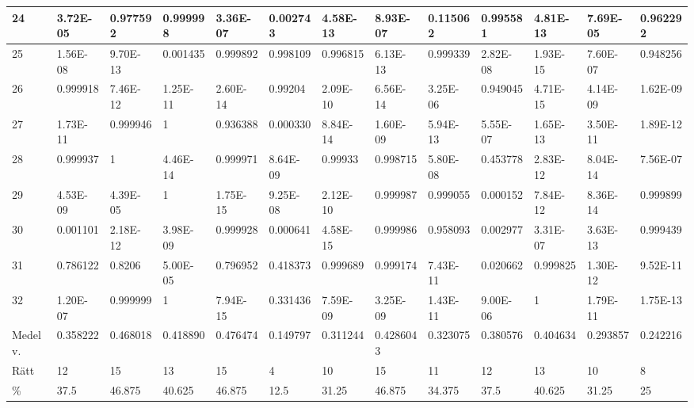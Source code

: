 \documentclass[a4paper,10pt]{article}
\begin{document}
\begin{centering}
{\begin{tabular}{ |l|l|l|l|l|l|l|l|l|l|l|l|l| }
24	       & 3.72E-05 & 0.977592 & 0.999998 & 3.36E-07 & 0.002743 & 4.58E-13 &  8.93E-07 & 0.115062  & 0.995581 &  4.81E-13 & 7.69E-05 & 0.962292 \\ \hline             
25	       & 1.56E-08 & 9.70E-13 & 0.001435 & 0.999892 & 0.998109 & 0.996815 &  6.13E-13 & 0.999339  & 2.82E-08 &  1.93E-15 & 7.60E-07 & 0.948256 \\ \hline             
26	       & 0.999918 & 7.46E-12 & 1.25E-11 & 2.60E-14 & 0.99204  & 2.09E-10 &  6.56E-14 & 3.25E-06  & 0.949045 &  4.71E-15 & 4.14E-09 & 1.62E-09 \\ \hline            
27	       & 1.73E-11 & 0.999946 & 1        & 0.936388 & 0.000330 & 8.84E-14 &  1.60E-09 & 5.94E-13  & 5.55E-07 &  1.65E-13 & 3.50E-11 & 1.89E-12 \\ \hline             
28	       & 0.999937 & 1        & 4.46E-14 & 0.999971 & 8.64E-09 & 0.99933  &  0.998715 & 5.80E-08  & 0.453778 &  2.83E-12 & 8.04E-14 & 7.56E-07 \\ \hline            
29	       & 4.53E-09 & 4.39E-05 & 1        & 1.75E-15 & 9.25E-08 & 2.12E-10 &  0.999987 & 0.999055  & 0.000152 &  7.84E-12 & 8.36E-14 & 0.999899 \\ \hline                
30	       & 0.001101 & 2.18E-12 & 3.98E-09 & 0.999928 & 0.000641 & 4.58E-15 &  0.999986 & 0.958093  & 0.002977 &  3.31E-07 & 3.63E-13 & 0.999439 \\ \hline               
31	       & 0.786122 & 0.8206   & 5.00E-05 & 0.796952 & 0.418373 & 0.999689 &  0.999174 & 7.43E-11  & 0.020662 &  0.999825 & 1.30E-12 & 9.52E-11 \\ \hline             
32	       & 1.20E-07 & 0.999999 & 1        & 7.94E-15 & 0.331436 & 7.59E-09 &  3.25E-09 & 1.43E-11  & 9.00E-06 &  1        & 1.79E-11 & 1.75E-13 \\ \hline\hline      
Medelv.    & 0.358222 & 0.468018 & 0.418890 & 0.476474 & 0.149797 & 0.311244 & 0.4286043 & 0.323075  & 0.380576 &  0.404634 & 0.293857 & 0.242216 \\ \hline  
Rätt & 12       & 15       & 13       & 15       & 4        & 10        	 &  15   & 11        & 12       & 13        & 10       & 8 \\ \hline
\%		   & 37.5     & 46.875   & 40.625   & 46.875   & 12.5     & 31.25    & 46.875    & 34.375    & 37.5     & 40.625    & 31.25    & 25 \\ \hline
\end{tabular}




}
\end{centering}
\end{document}

